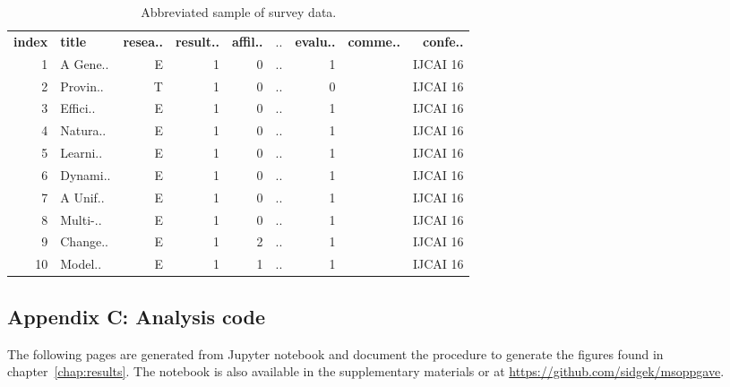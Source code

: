 \begin{table}[!h]
\begin{center}
    \begin{tabular}{ rlrrrrrrr }
    \textbf{index} & \textbf{title} & \textbf{resea..} & \textbf{result..} & \textbf{affil..} & .. & \textbf{evalu..} & \textbf{comme..} & \textbf{confe..} \\
    1 & A Gene.. & E & 1 & 0 & ..	& 1 & & IJCAI 16 \\
    2 & Provin.. & T &	1 &	0 & .. & 0 & & IJCAI 16 \\
    3 &	Effici.. &	E &	1 &	0 & .. & 1 & & IJCAI 16 \\
    4 &	Natura.. & E &	1 &	0 &	.. & 1 & & IJCAI 16 \\
    5 &	Learni.. & E &	1 &	0 & .. & 1 & & IJCAI 16 \\
    6 &	Dynami.. & E &	1 &	0 & .. & 1 & & IJCAI 16 \\
    7 &	A Unif.. & E &	1 &	0 &	.. & 1 & & IJCAI 16 \\
    8 &	Multi-.. & E &	1 &	0 & .. & 1 & & IJCAI 16 \\
    9 &	Change.. & E &	1 &	2 & .. & 1 & & IJCAI 16 \\
    10 & Model.. & E & 1 & 1 & .. & 1 & & IJCAI 16 \\
    \end{tabular}
\end{center}
\caption{Abbreviated sample of survey data.}
\label{tab:sample_survey_data}
\end{table}

\subsection*{Appendix C: Analysis code}
\label{app:analysis_code}
The following pages are generated from Jupyter notebook and document the procedure to generate the figures found in chapter~\ref{chap:results}. The notebook is also available in the supplementary materials or at \url{https://github.com/sidgek/msoppgave}.

